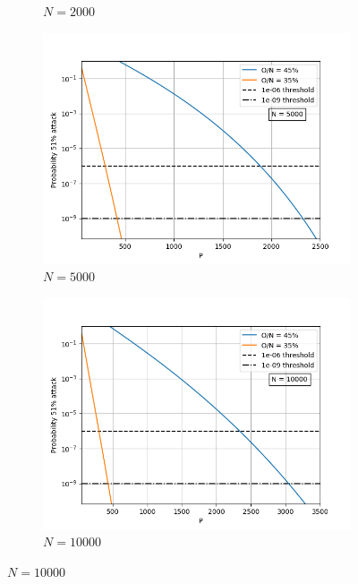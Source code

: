 \begin{figure}[H]
\begin{subfigure}[b]{0.45\textwidth}
        \renewcommand{\thesubfigure}{a}
     \caption{$N = 2000$}
        \label{fig:N2000}
    \end{subfigure}
    \begin{subfigure}[b]{0.45\textwidth}
        \includegraphics[width=\textwidth]{Figures/Prob51_vs_P_N5000_O35_to_45} 
        \renewcommand{\thesubfigure}{b}
        \caption{$N = 5000$}
        \label{fig:N5000}
    \end{subfigure}
        \begin{subfigure}[b]{0.45\textwidth}
        \includegraphics[width=\textwidth]{Figures/Prob51_vs_P_N10000_O35_to_45}  
       \renewcommand{\thesubfigure}{c}
        \caption{$N = 10000$}
        \label{fig:N10000}
    \end{subfigure}

\end{figure}
